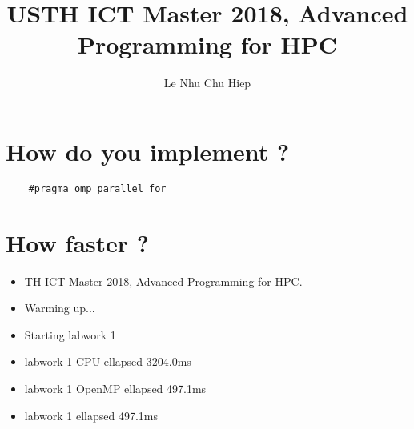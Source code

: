 \documentclass{article}
\title{USTH ICT Master 2018, Advanced Programming for HPC}
\author{Le Nhu Chu Hiep}
\date{}
\begin{document}
\section{How do you implement ?}
\begin{verbatim}
	#pragma omp parallel for
\end{verbatim}
\section{How faster ?}
\begin{itemize}
	\item TH ICT Master 2018, Advanced Programming for HPC.
	\item Warming up...
	\item Starting labwork 1
	\item labwork 1 CPU ellapsed 3204.0ms
	\item labwork 1 OpenMP ellapsed 497.1ms
	\item labwork 1 ellapsed 497.1ms
\end{itemize}
\end{document}
